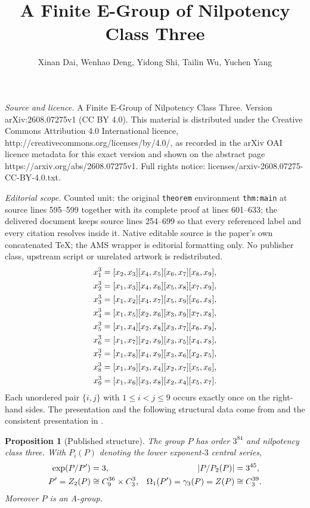 \documentclass[10pt,a4paper]{amsart}
\newtheorem{proposition}[theorem]{Proposition}
\begin{document}
\title[A Finite E-Group of Nilpotency Class Three]{A Finite E-Group of Nilpotency Class Three}
\author{Xinan Dai, Wenhao Deng, Yidong Shi, Tailin Wu, Yuchen Yang}
\date{}
\maketitle
\noindent\emph{Source and licence.} A Finite E-Group of Nilpotency Class Three. Version arXiv:2608.07275v1 (CC BY 4.0). This material is distributed under the Creative Commons Attribution 4.0 International licence, http://creativecommons.org/licenses/by/4.0/, as recorded in the arXiv OAI licence metadata for this exact version and shown on the abstract page https://arxiv.org/abs/2608.07275v1. Full rights notice: licenses/arxiv-2608.07275-CC-BY-4.0.txt.\par\smallskip
\noindent\textit{Editorial scope.} Counted unit: the original \texttt{theorem} environment \texttt{thm:main} at source lines 595--599 together with its complete proof at lines 601--633; the delivered document keeps source lines 254--699 so that every referenced label and every citation resolves inside it. Native editable source is the paper's own concatenated TeX; the AMS wrapper is editorial formatting only. No publisher class, upstream script or unrelated artwork is redistributed.
\begin{align}
 x_1^3&=[x_2,x_3][x_4,x_5][x_6,x_7][x_8,x_9],\notag\\
 x_2^3&=[x_1,x_3][x_4,x_6][x_5,x_8][x_7,x_9],\notag\\
 x_3^3&=[x_1,x_2][x_4,x_7][x_5,x_9][x_6,x_8],\notag\\
 x_4^3&=[x_1,x_5][x_2,x_6][x_3,x_9][x_7,x_8],\notag\\
 x_5^3&=[x_1,x_4][x_2,x_8][x_3,x_7][x_6,x_9],\label{eq:relations}\\
 x_6^3&=[x_1,x_7][x_2,x_9][x_3,x_5][x_4,x_8],\notag\\
 x_7^3&=[x_1,x_8][x_4,x_9][x_3,x_6][x_2,x_5],\notag\\
 x_8^3&=[x_1,x_9][x_3,x_4][x_2,x_7][x_5,x_6],\notag\\
 x_9^3&=[x_1,x_6][x_3,x_8][x_2,x_4][x_5,x_7].\notag
\end{align}
Each unordered pair $\{i,j\}$ with $1\le i<j\le9$ occurs exactly once on
the right-hand sides.  The presentation and the following structural data
come from \cite[Remark~2.1]{AFH08three} and the consistent presentation in
\cite[p.~2]{AFLObrien10}.

\begin{proposition}[Published structure]\label{prop:published}
The group $P$ has order $3^{84}$ and nilpotency class three.  With
$P_i(P)$ denoting the lower exponent-$3$ central series,
\begin{align}
 \exp(P/P')&=3, & |P/P_2(P)|&=3^{45},\notag\\
 P'=Z_2(P)&\cong C_9^{36}\times C_3^3,
 & \Omega_1(P')=\gamma_3(P)=Z(P)&\cong C_3^{39}.\label{eq:published}
\end{align}
Moreover $P$ is an A-group.
\end{proposition}
\end{document}
